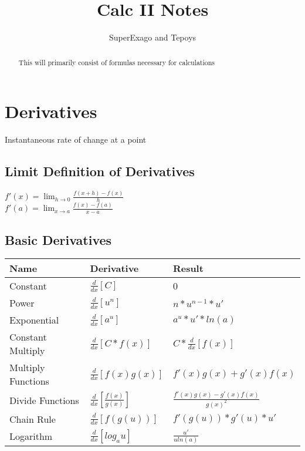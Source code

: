 \documentclass[17pt]{extarticle}
\title{Calc II Notes}
\author{SuperExago and Tepoys}
\begin{document}
\maketitle

\begin{abstract}
This will primarily consist of formulas necessary for calculations
\end{abstract}
\clearpage
\section{Derivatives}
Instantaneous rate of change at a point
\subsection{Limit Definition of Derivatives}
$f\prime(x)=\lim_{h \to 0}{\frac{f(x+h)-f(x)}{h}}$\\
$f\prime(a)=\lim_{x \to a}{\frac{f(x)-f(a)}{x-a}}$

\subsection{Basic Derivatives}
\renewcommand{\arraystretch}{2}
\begin{table}[H]
\centering
\begin{tabular}{|l|l|l|}
\hline
\rowcolor{githublightgray}
Name & Derivative & Result\\

\hline
Constant&$\frac{d}{dx}[C]$&0\\
\hline
Power&$\frac{d}{dx}[u^n]$&$n*u^{n-1}*u\prime$\\
\hline
Exponential&$\frac{d}{dx}[a^u]$&$a^u*u\prime *ln(a)$\\
\hline
Constant Multiply&$\frac{d}{dx}[C*f(x)]$&$C*\frac{d}{dx}[f(x)]$\\
\hline
Multiply Functions&$\frac{d}{dx}[f(x)g(x)]$&$f\prime(x)g(x)+g\prime(x)f(x)$\\
\hline
Divide Functions&$\frac{d}{dx}[\frac{f(x)}{g(x)}]$&$\frac{f\prime(x)g(x)-g\prime(x)f(x)}{g(x)^2}$\\
\hline
Chain Rule&$\frac{d}{dx}[f(g(u))]$&$f\prime(g(u))*g\prime(u)*u\prime$\\
\hline
Logarithm&$\frac{d}{dx}[log_au]$&$\frac{u\prime}{uln(a)}$\\
\hline
\end{tabular}
\end{table}
\end{document}
